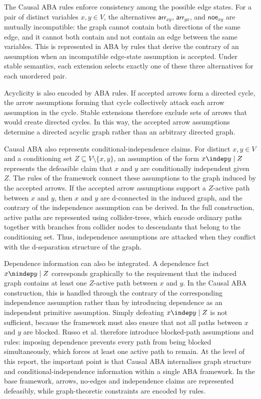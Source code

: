 The Causal ABA rules enforce consistency among the possible edge states. For a pair of distinct variables \(x,y \in V\), the alternatives \(\mathsf{arr}_{xy}\), \(\mathsf{arr}_{yx}\), and \(\mathsf{noe}_{xy}\) are mutually incompatible: the graph cannot contain both directions of the same edge, and it cannot both contain and not contain an edge between the same variables. This is represented in ABA by rules that derive the contrary of an assumption when an incompatible edge-state assumption is accepted. Under stable semantics, each extension selects exactly one of these three alternatives for each unordered pair.

Acyclicity is also encoded by ABA rules. If accepted arrows form a directed cycle, the arrow assumptions forming that cycle collectively attack each arrow assumption in the cycle. Stable extensions therefore exclude sets of arrows that would create directed cycles. In this way, the accepted arrow assumptions determine a directed acyclic graph rather than an arbitrary directed graph.

Causal ABA also represents conditional-independence claims. For distinct \(x,y \in V\) and a conditioning set \(Z \subseteq V \setminus \{x,y\}\), an assumption of the form \(x \indep y \mid Z\) represents the defeasible claim that \(x\) and \(y\) are conditionally independent given \(Z\). The rules of the framework connect these assumptions to the graph induced by the accepted arrows. If the accepted arrow assumptions support a \(Z\)-active path between \(x\) and \(y\), then \(x\) and \(y\) are d-connected in the induced graph, and the contrary of the independence assumption can be derived. In the full construction, active paths are represented using collider-trees, which encode ordinary paths together with branches from collider nodes to descendants that belong to the conditioning set. Thus, independence assumptions are attacked when they conflict with the d-separation structure of the graph.

Dependence information can also be integrated. A dependence fact \(x \nindep y \mid Z\) corresponds graphically to the requirement that the induced graph contains at least one \(Z\)-active path between \(x\) and \(y\). In the Causal ABA construction, this is handled through the contrary of the corresponding independence assumption rather than by introducing dependence as an independent primitive assumption. Simply defeating \(x \indep y \mid Z\) is not sufficient, because the framework must also ensure that not all paths between \(x\) and \(y\) are blocked. Russo et al. therefore introduce blocked-path assumptions and rules: imposing dependence prevents every path from being blocked simultaneously, which forces at least one active path to remain. At the level of this report, the important point is that Causal ABA internalises graph structure and conditional-independence information within a single ABA framework. In the base framework, arrows, no-edges and independence claims are represented defeasibly, while graph-theoretic constraints are encoded by rules.

